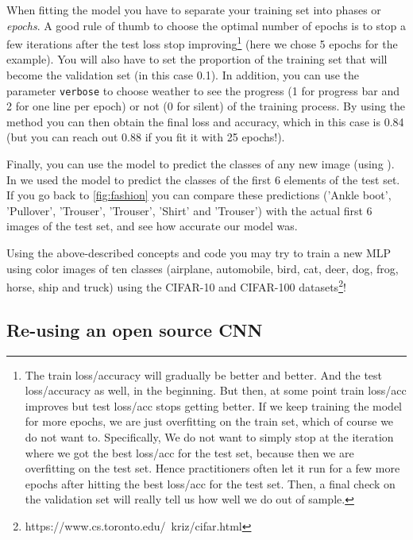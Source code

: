 When fitting the model you have to separate your training set into phases or \textit{epochs}. A good rule of thumb to choose the optimal number of epochs is to stop a few iterations after the test loss stop improving\footnote{The train loss/accuracy will gradually be better and better. And the test loss/accuracy as well, in the beginning. But then, at some point train loss/acc improves but test loss/acc stops getting better. If we keep training the model for more epochs, we are just overfitting on the train set, which of course we do not want to. Specifically, We do not want to simply stop at the iteration where we got the best loss/acc for the test set, because then we are overfitting on the test set. Hence practitioners often let it run for a few more epochs after hitting the best loss/acc for the test set. Then, a final check on the validation set will really tell us how well we do out of sample.}   (here we chose 5 epochs for the example). You will also have to set the proportion of the training set that will become the validation set (in this case 0.1). In addition, you can use the parameter \texttt{verbose} to choose weather to see the progress (1 for progress bar and 2 for one line per epoch) or not (0 for silent) of the training process. By using the method  you can then obtain the final loss and accuracy, which in this case is 0.84 (but you can reach out 0.88 if you fit it with 25 epochs!).


Finally, you can use the model to predict the classes of any new image (using ). In  we used the model to predict the classes of the first 6 elements of the test set. If you go back to \ref{fig:fashion} you can compare these predictions ('Ankle boot', 'Pullover', 'Trouser', 'Trouser', 'Shirt' and 'Trouser') with the actual first 6 images of the test set, and see how accurate our model was.


Using the above-described concepts and code you may try to train a new MLP using color images of ten classes (airplane, automobile, bird, cat, deer, dog, frog, horse, ship and truck) using the CIFAR-10 and CIFAR-100 datasets\footnote{https://www.cs.toronto.edu/~kriz/cifar.html}!


\subsection{Re-using an open source CNN}
\label{subsec:tuning}

